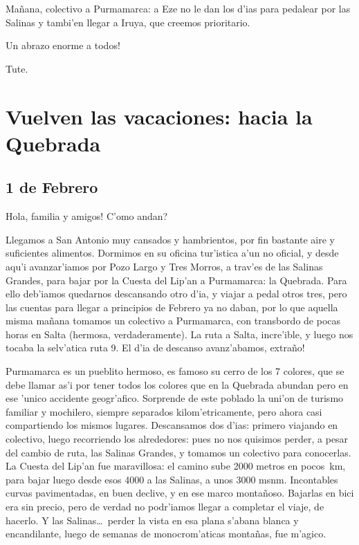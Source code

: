Ma\~nana, colectivo a Purmamarca: a Eze no le dan los d'ias para pedalear por
las Salinas y tambi'en llegar a Iruya, que creemos prioritario.

\textexclamdown Un abrazo enorme a todos!

Tute.

\section{Vuelven las vacaciones: hacia la Quebrada}

\subsection*{1 de Febrero}

\textexclamdown Hola, familia y amigos! \textquestiondown C'omo andan?

Llegamos a San Antonio muy cansados y hambrientos, por fin bastante aire y
suficientes alimentos. Dormimos en su oficina tur'istica a'un no oficial, y
desde aqu'i avanzar'iamos por Pozo Largo y Tres Morros, a trav'es de las Salinas
Grandes, para bajar por la Cuesta del Lip'an a Purmamarca: la Quebrada. Para
ello deb'iamos quedarnos descansando otro d'ia, y viajar a pedal otros tres,
pero las cuentas para llegar a principios de Febrero ya no daban, por lo que
aquella misma ma\~nana tomamos un colectivo a Purmamarca, con transbordo de
pocas horas en Salta (hermosa, verdaderamente). La ruta a Salta, incre'ible, y
luego nos tocaba la selv'atica ruta 9. El d'ia de descanso avanz'abamos,
\textexclamdown extra\~no!

Purmamarca es un pueblito hermoso, es famoso su cerro de los 7 colores, que se
debe llamar as'i por tener todos los colores que en la Quebrada abundan pero en
ese 'unico accidente geogr'afico. Sorprende de este poblado la uni'on de turismo
familiar y mochilero, siempre separados kilom'etricamente, pero ahora casi
compartiendo los mismos lugares. Descansamos dos d'ias: primero viajando en
colectivo, luego recorriendo los alrededores: pues no nos quisimos perder, a
pesar del cambio de ruta, las Salinas Grandes, y tomamos un colectivo para
conocerlas. La Cuesta del Lip'an fue maravillosa: el camino sube 2000 metros en
pocos~km, para bajar luego desde esos 4000 a las Salinas, a unos 3000 msnm.
Incontables curvas pavimentadas, en buen declive, y en ese marco monta\~noso.
Bajarlas en bici era sin precio, pero de verdad no podr'iamos llegar a completar
el viaje, de hacerlo. Y las Salinas\ldots\ perder la vista en esa plana s'abana
blanca y encandilante, luego de semanas de monocrom'aticas monta\~nas, fue
m'agico.

